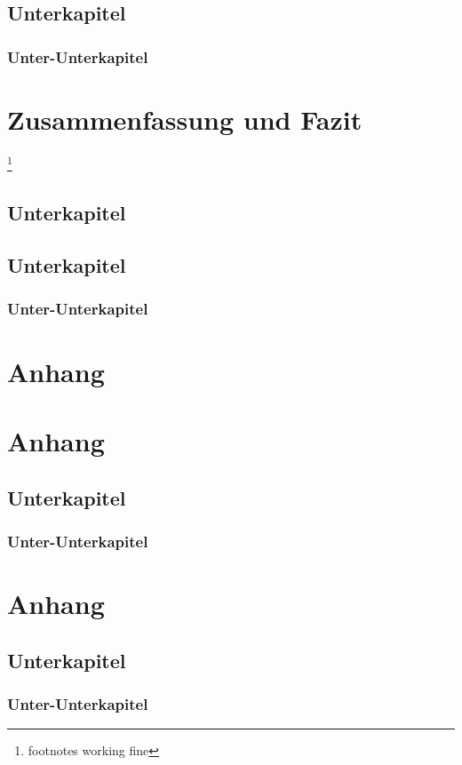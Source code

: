 \documentclass[12pt, a4paper, twoside, titlepage, showtrims]{scrbook} %
\begin{document}
\section{Unterkapitel}
\subsection{Unter-Unterkapitel}

\chapter{Zusammenfassung und Fazit}
\footnote{footnotes working fine}
\lipsum[3-21]
\section{Unterkapitel}
\lipsum[3-21]
\section{Unterkapitel}
\subsection{Unter-Unterkapitel}

\appendix
\chapter{Anhang}
\chapter{Anhang}
\section{Unterkapitel}
\subsection{Unter-Unterkapitel}
\chapter{Anhang}
\section{Unterkapitel}
\subsection{Unter-Unterkapitel}
\end{document}
